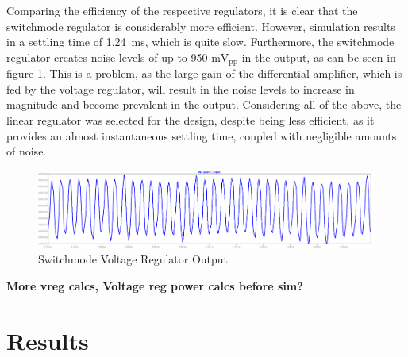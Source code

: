 Comparing the efficiency of the respective regulators, it is clear that the switchmode regulator is considerably more efficient. However, simulation results in a settling time of \SI{1.24}{ms}, which is quite slow. Furthermore, the switchmode regulator creates noise levels of up to 950 $\mathrm{mV_{pp}}$ in the output, as can be seen in figure \ref{fig:smnoise}. This is a problem, as the large gain of the differential amplifier, which is fed by the voltage regulator, will result in the noise levels to increase in magnitude and become prevalent in the output. Considering all of the above, the linear regulator was selected for the design, despite being less efficient, as it provides an almost instantaneous settling time, coupled with negligible amounts of noise.

\begin{figure}[h]
    \centering
    \includegraphics[width = 1\textwidth]{Figures/smnoise.png}
    \caption{Switchmode Voltage Regulator Output}
    \label{fig:smnoise}
\end{figure}

\textbf{More vreg calcs, Voltage reg power calcs before sim?}

\section{Results} \label{sec:volt_results}

